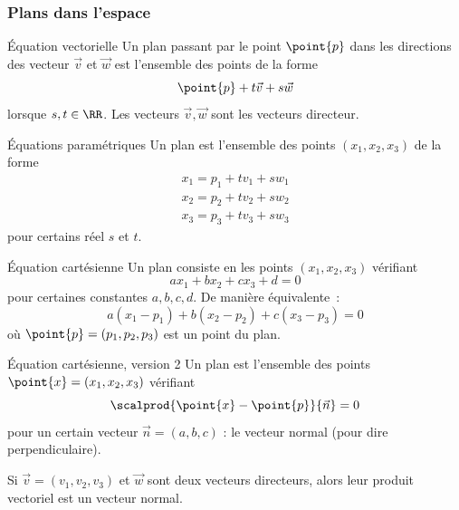 \documentclass[french,xcolor=svgnames]{beamer}
\begin{document}
\subsubsection{Plans dans l'espace}
\begin{frame}
  \begin{block}{Équation vectorielle}
    Un plan passant par le point \(\point{p}\) dans les directions des vecteur \(\vec{v}\) et \(\vec{w}\) est l'ensemble des points de la forme
    \begin{equation*}
      \point{p} + t \vec{v} + s \vec{w}
    \end{equation*}
    lorsque \(s,t \in \RR\). Les vecteurs \(\vec{v}, \vec{w}\) sont les vecteurs directeur.
  \end{block}\pause
  \begin{block}{Équations paramétriques}
    Un plan est l'ensemble des points \((x_{1},x_{2},x_{3})\) de la forme
    \begin{align*}
      x_{1} = p_1 + t v_1 + s w_1\\
      x_{2} = p_2 + t v_2 + s w_2\\
      x_{3} = p_3 + t v_3 + s w_3
    \end{align*}
    pour certains réel \(s\) et \(t\).
  \end{block}
\end{frame}
\begin{frame}
\begin{block}{Équation cartésienne}
    Un plan consiste en les points \((x_{1},x_{2},x_{3})\) vérifiant
    \begin{equation*}
      a x_{1} + b x_{2} + c x_{3} + d = 0
    \end{equation*}
    pour certaines constantes \(a,b,c,d\). De manière équivalente~:
    \begin{equation*}
      a (x_{1} - p_{1}) + b (x_{2} - p_{2}) + c (x_{3} - p_{3}) = 0
    \end{equation*}
    où \(\point{p} = (p_{1},p_{2},p_{3})\) est un point du plan.
  \end{block}\pause
  \begin{block}{Équation cartésienne, version 2}
    Un plan est l'ensemble des points \(\point{x} = (x_{1},x_{2},x_{3})\) vérifiant
    \begin{equation*}
      \scalprod{\point{x} - \point{p}}{\vec{n}} = 0
    \end{equation*}
    pour un certain vecteur \(\vec{n}= (a,b,c)\) : le vecteur normal (pour dire \og perpendiculaire\fg{}).
  \end{block}\pause
  \begin{proposition}
    Si \(\vec{v} = (v_{1},v_{2},v_{3})\) et \(\vec{w}\) sont deux vecteurs directeurs, alors leur produit vectoriel est un vecteur normal.
  \end{proposition}
\end{frame}
\end{document}
